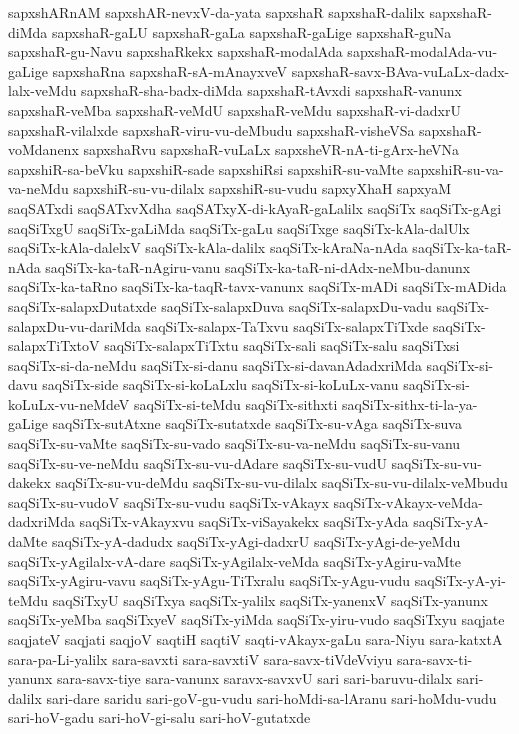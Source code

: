 {sapxshARnAM
sapxshAR-nevxV-da-yata
sapxshaR
sapxshaR-dalilx
sapxshaR-diMda
sapxshaR-gaLU
sapxshaR-gaLa
sapxshaR-gaLige
sapxshaR-guNa
sapxshaR-gu-Navu
sapxshaRkekx
sapxshaR-modalAda
sapxshaR-modalAda-vu-gaLige
sapxshaRna
sapxshaR-sA-mAnayxveV
sapxshaR-savx-BAva-vuLaLx-dadx-lalx-veMdu
sapxshaR-sha-badx-diMda
sapxshaR-tAvxdi
sapxshaR-vanunx
sapxshaR-veMba
sapxshaR-veMdU
sapxshaR-veMdu
sapxshaR-vi-dadxrU
sapxshaR-vilalxde
sapxshaR-viru-vu-deMbudu
sapxshaR-visheVSa
sapxshaR-voMdanenx
sapxshaRvu
sapxshaR-vuLaLx
sapxsheVR-nA-ti-gArx-heVNa
sapxshiR-sa-beVku
sapxshiR-sade
sapxshiRsi
sapxshiR-su-vaMte
sapxshiR-su-va-va-neMdu
sapxshiR-su-vu-dilalx
sapxshiR-su-vudu
sapxyXhaH
sapxyaM
saqSATxdi
saqSATxvXdha
saqSATxyX-di-kAyaR-gaLalilx
saqSiTx
saqSiTx-gAgi
saqSiTxgU
saqSiTx-gaLiMda
saqSiTx-gaLu
saqSiTxge
saqSiTx-kAla-dalUlx
saqSiTx-kAla-dalelxV
saqSiTx-kAla-dalilx
saqSiTx-kAraNa-nAda
saqSiTx-ka-taR-nAda
saqSiTx-ka-taR-nAgiru-vanu
saqSiTx-ka-taR-ni-dAdx-neMbu-danunx
saqSiTx-ka-taRno
saqSiTx-ka-taqR-tavx-vanunx
saqSiTx-mADi
saqSiTx-mADida
saqSiTx-salapxDutatxde
saqSiTx-salapxDuva
saqSiTx-salapxDu-vadu
saqSiTx-salapxDu-vu-dariMda
saqSiTx-salapx-TaTxvu
saqSiTx-salapxTiTxde
saqSiTx-salapxTiTxtoV
saqSiTx-salapxTiTxtu
saqSiTx-sali
saqSiTx-salu
saqSiTxsi
saqSiTx-si-da-neMdu
saqSiTx-si-danu
saqSiTx-si-davanAdadxriMda
saqSiTx-si-davu
saqSiTx-side
saqSiTx-si-koLaLxlu
saqSiTx-si-koLuLx-vanu
saqSiTx-si-koLuLx-vu-neMdeV
saqSiTx-si-teMdu
saqSiTx-sithxti
saqSiTx-sithx-ti-la-ya-gaLige
saqSiTx-sutAtxne
saqSiTx-sutatxde
saqSiTx-su-vAga
saqSiTx-suva
saqSiTx-su-vaMte
saqSiTx-su-vado
saqSiTx-su-va-neMdu
saqSiTx-su-vanu
saqSiTx-su-ve-neMdu
saqSiTx-su-vu-dAdare
saqSiTx-su-vudU
saqSiTx-su-vu-dakekx
saqSiTx-su-vu-deMdu
saqSiTx-su-vu-dilalx
saqSiTx-su-vu-dilalx-veMbudu
saqSiTx-su-vudoV
saqSiTx-su-vudu
saqSiTx-vAkayx
saqSiTx-vAkayx-veMda-dadxriMda
saqSiTx-vAkayxvu
saqSiTx-viSayakekx
saqSiTx-yAda
saqSiTx-yA-daMte
saqSiTx-yA-dadudx
saqSiTx-yAgi-dadxrU
saqSiTx-yAgi-de-yeMdu
saqSiTx-yAgilalx-vA-dare
saqSiTx-yAgilalx-veMda
saqSiTx-yAgiru-vaMte
saqSiTx-yAgiru-vavu
saqSiTx-yAgu-TiTxralu
saqSiTx-yAgu-vudu
saqSiTx-yA-yi-teMdu
saqSiTxyU
saqSiTxya
saqSiTx-yalilx
saqSiTx-yanenxV
saqSiTx-yanunx
saqSiTx-yeMba
saqSiTxyeV
saqSiTx-yiMda
saqSiTx-yiru-vudo
saqSiTxyu
saqjate
saqjateV
saqjati
saqjoV
saqtiH
saqtiV
saqti-vAkayx-gaLu
sara-Niyu
sara-katxtA
sara-pa-Li-yalilx
sara-savxti
sara-savxtiV
sara-savx-tiVdeVviyu
sara-savx-ti-yanunx
sara-savx-tiye
sara-vanunx
saravx-savxvU
sari
sari-baruvu-dilalx
sari-dalilx
sari-dare
saridu
sari-goV-gu-vudu
sari-hoMdi-sa-lAranu
sari-hoMdu-vudu
sari-hoV-gadu
sari-hoV-gi-salu
sari-hoV-gutatxde
}
